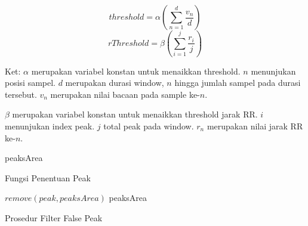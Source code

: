 \begin{equation}
threshold = \alpha (\sum_{n=1}^{d} \frac{v_{n}}{d})
\label{eq:threshold} 
\end{equation}
\begin{equation}
rThreshold = \beta (\sum_{i=1}^{j} \frac{r_{i}}{j})
\label{eq:r_threshold} 
\end{equation}

Ket:
$\alpha$ merupakan variabel konstan untuk menaikkan threshold. $n$ menunjukan posisi sampel. $d$ merupakan durasi window, $n$ hingga jumlah sampel pada durasi tersebut. $v_{n}$ merupakan nilai bacaan pada sample ke-$n$.

$\beta$ merupakan variabel konstan untuk menaikkan threshold jarak RR. $i$ menunjukan index peak. $j$ total peak pada window. $r_{n}$ merupakan nilai jarak RR ke-$n$.

\begin{algorithm}[H]
 \begin{algorithmic}[1]
   	\State {}
	   			\State {}
				\State {}
				\State {}
				\State {}
				\State {}
				\State {}	
			\EndIf
	   	\Else
	   		\State {}
   		\EndIf
	\EndFor	
	\State \Return peaksArea
	\EndFunction
 \end{algorithmic}
 \caption{Fungsi Penentuan Peak}\label{Algo:peaksFind}
\end{algorithm} 

\begin{algorithm}[H]
 \begin{algorithmic}[1]
	\State {}
   	   	 
	   		\State $remove(peak, peaksArea)$ 
   		\EndIf
	\EndFor	
	\State \Return peaksArea
	\EndFunction
 \end{algorithmic}
 \caption{Prosedur Filter False Peak}\label{Algo:peaksRemove}
\end{algorithm}

